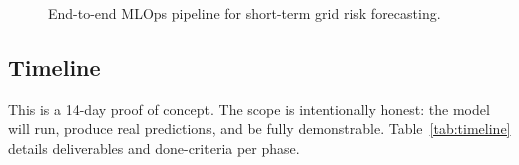 \documentclass[11pt, a4paper]{article}
\begin{document}
\begin{figure}[H]
{%
}
\caption{End-to-end MLOps pipeline for short-term grid risk forecasting.}
\label{fig:mlops_pipeline_clean_final}
\end{figure}

\subsection{Timeline}

This is a 14-day proof of concept. The scope is intentionally honest: the
model will run, produce real predictions, and be fully demonstrable.
Table~\ref{tab:timeline} details deliverables and done-criteria per phase.
\end{document}
